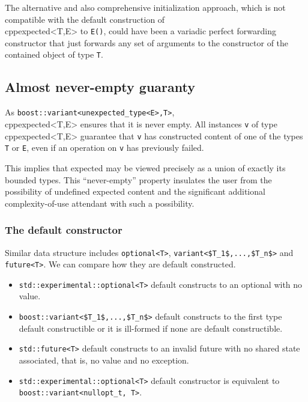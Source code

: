\documentclass[a4paper,10pt]{article}
\newcommand{\cpp}[1]{\lstinline{#1}}
\begin{document}
The alternative and also comprehensive initialization approach, which is not compatible with the default construction of \\cpp{expected<T,E>} to \cpp{E()}, could have been a variadic perfect forwarding constructor that just forwards any set of arguments to the constructor of the contained object of type \cpp{T}. 

\subsection{Almost never-empty guaranty}

As \cpp{boost::variant<unexpected_type<E>,T>}, \\cpp{expected<T,E>} ensures that it is never empty. All instances \cpp{v} of type \\cpp{expected<T,E>} guarantee that \cpp{v} has constructed content of one of the types \cpp{T} or \cpp{E}, even if an operation on \cpp{v} has previously failed.

This implies that expected may be viewed precisely as a union of exactly its bounded types. This ``never-empty'' property insulates the user from the possibility of undefined expected content and the significant additional complexity-of-use attendant with such a possibility.

\subsubsection{The default constructor}

Similar data structure includes \cpp{optional<T>}, \lstinline[mathescape]{variant<$T_1$,...,$T_n$>} and \cpp{future<T>}. We can compare how they are default constructed.
\begin{itemize}
\item \cpp{std::experimental::optional<T>} default constructs to an optional with no value. 
\item \lstinline[mathescape]{boost::variant<$T_1$,...,$T_n$>} default constructs to the first type default constructible or it is ill-formed if none are default constructible.
\item \cpp{std::future<T>} default constructs to an invalid future with no shared state associated, that is, no value and no exception.
\item \cpp{std::experimental::optional<T>} default constructor is equivalent to \cpp{boost::variant<nullopt_t, T>}.
\end{itemize}
\end{document}
